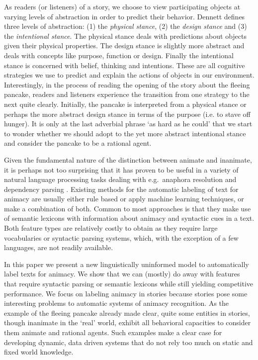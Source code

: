 \documentclass[a4paper,UKenglish]{oasics}
\begin{document}
As readers (or listeners) of a story, we choose to view participating
objects at varying levels of abstraction in order to predict their
behavior. Dennett \cite{dennett:96} defines three levels of
abstraction: (1) the \textit{physical stance}, (2) the \textit{design
  stance} and (3) the \textit{intentional stance}. The physical stance
deals with predictions about objects given their physical
properties. The design stance is slightly more abstract and deals with
concepts like purpose, function or design. Finally the intentional
stance is concerned with belief, thinking and intentions. These are
all cognitive strategies we use to predict and explain the actions of
objects in our environment. Interestingly, in the process of reading
the opening of the story about the fleeing pancake, readers and
listeners experience the transition from one strategy to the next
quite clearly. Initially, the pancake is interpreted from a physical
stance or perhaps the more abstract design stance in terms of the
purpose (i.e. to stave off hunger). It is only at the last adverbial
phrase `as hard as he could' that we start to wonder whether we should
adopt to the yet more abstract intentional stance and consider the
pancake to be a rational agent.

Given the fundamental nature of the distinction between animate and
inanimate, it is perhaps not too surprising that it has proven to be
useful in a variety of natural language processing tasks dealing with
e.g.\ anaphora resolution and dependency parsing
\cite{orasan:07,lee:13,ovr:niv:07}. Existing methods for the automatic
labeling of text for animacy are usually either rule based or apply
machine learning techniques, or make a combination of both. Common to
most approaches is that they make use of semantic lexicons with
information about animacy and syntactic cues in a text. Both feature
types are relatively costly to obtain as they require large
vocabularies or syntactic parsing systems, which, with the exception
of a few languages, are not readily available.

In this paper we present a new linguistically uninformed model to
automatically label texts for animacy. We show that we can (mostly)
do away with features that require syntactic parsing or semantic
lexicons while still yielding competitive performance. We focus
on labeling animacy in stories because stories pose some interesting
problems to automatic systems of animacy recognition. As the example
of the fleeing pancake already made clear, quite some entities in
stories, though inanimate in the `real' world, exhibit all behavioral
capacities to consider them animate and rational agents. Such
examples make a clear case for developing dynamic, data driven systems
that do not rely too much on static and fixed world knowledge.
\end{document}
